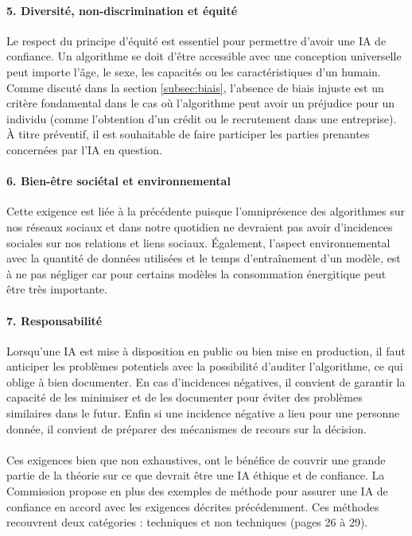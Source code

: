 \documentclass[10pt, french, a4paper]{report}
\begin{document}
\paragraph{5. Diversité, non-discrimination et équité} Le respect du principe d'équité est essentiel pour permettre d'avoir une IA de confiance. Un algorithme se doit d'être accessible avec une conception universelle peut importe l'âge, le sexe, les capacités ou les caractéristiques d'un humain. Comme discuté dans la section \ref{subsec:biais}, l'absence de biais injuste est un critère fondamental dans le cas où l'algorithme peut avoir un préjudice pour un individu (comme l'obtention d'un crédit ou le recrutement dans une entreprise). \uppercase{à} titre préventif, il est souhaitable de faire participer les parties prenantes concernées par l'IA en question.

\paragraph{6. Bien-être sociétal et environnemental} Cette exigence est liée à la précédente puisque l'omniprésence des algorithmes sur nos réseaux sociaux et dans notre quotidien ne devraient pas avoir d'incidences sociales sur nos relations et liens sociaux. \uppercase{é}galement, l'aspect environnemental avec la quantité de données utilisées et le temps d'entraînement d'un modèle, est à ne pas négliger car pour certains modèles la consommation énergitique peut être très importante.

\paragraph{7. Responsabilité} Lorsqu'une IA est mise à disposition en public ou bien mise en production, il faut anticiper les problèmes potentiels avec la possibilité d'auditer l'algorithme, ce qui oblige à bien documenter. En cas d'incidences négatives, il convient de garantir la capacité de les minimiser et de les documenter pour éviter des problèmes similaires dans le futur. Enfin si une incidence négative a lieu pour une personne donnée, il convient de préparer des mécanismes de recours sur la décision.

\paragraph{}
Ces exigences bien que non exhaustives, ont le bénéfice de couvrir une grande partie de la théorie sur ce que devrait être une IA éthique et de confiance. La Commission propose en plus des exemples de méthode pour assurer une IA de confiance en accord avec les exigences décrites précédemment. Ces méthodes recouvrent deux catégories : techniques et non techniques (pages 26 à 29).
\end{document}
